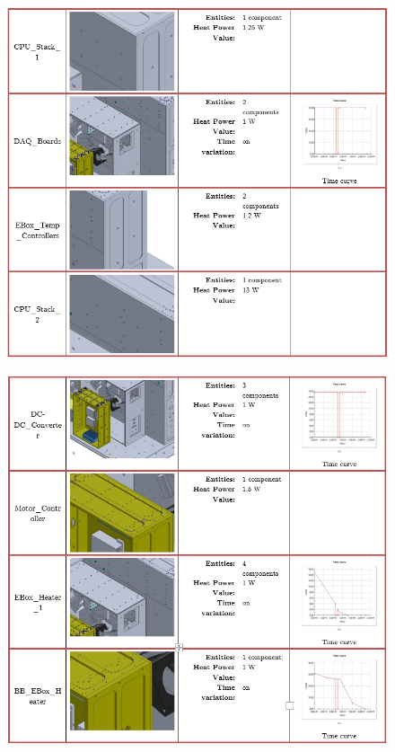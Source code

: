 \begin{figure}
    \centering
    \includegraphics[width=\textwidth]{thermal_load_images/sunrise_TL_images/sunrise_3.PNG}
\end{figure}

\begin{figure}
    \centering
    \includegraphics[width=\textwidth]{thermal_load_images/sunrise_TL_images/sunrise_4.PNG}
\end{figure}

